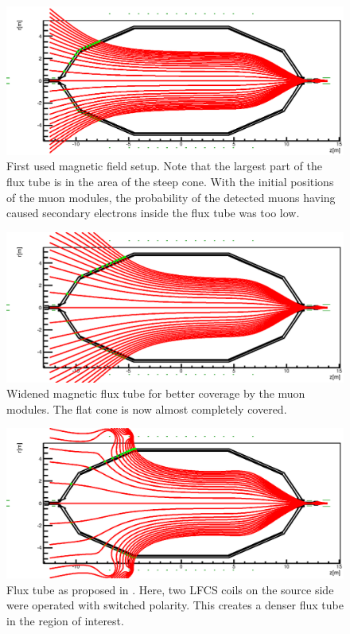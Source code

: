   \begin{figure}
	\centerline{\includegraphics[width = 1.1\textwidth]{graphics/analysis/mainSpec/fieldSimulation/fieldlines_100A.eps}}
	\caption[Flux tube setting A]{First used magnetic field setup. Note that the largest part of the flux tube is in the area of the steep cone. With the initial positions of the muon modules, the probability of the detected muons having caused secondary electrons inside the flux tube was too low.}
  	\label{fig:mainSpec_100A}
  \end{figure}


  \begin{figure}
	\centerline{\includegraphics[width = 1.1\textwidth]{graphics/analysis/mainSpec/fieldSimulation/fieldlineConfigC.eps}}
	\caption[Flux tube setting B]{Widened magnetic flux tube for better coverage by the muon modules. The flat cone is now almost completely covered.}
  	\label{fig:mainSpec_B}
  \end{figure}

  
  \begin{figure}
	\centerline{\includegraphics[width = 1.1\textwidth]{graphics//analysis/mainSpec/fieldSimulation/fieldlines_9.eps}}
	\caption[Flux tube setting C]{Flux tube as proposed in \cite{proposalM12}. Here, two LFCS coils on the source side were operated with switched polarity. This creates a denser flux tube in the region of interest.}
  	\label{fig:mainSpec_9}
  \end{figure}

